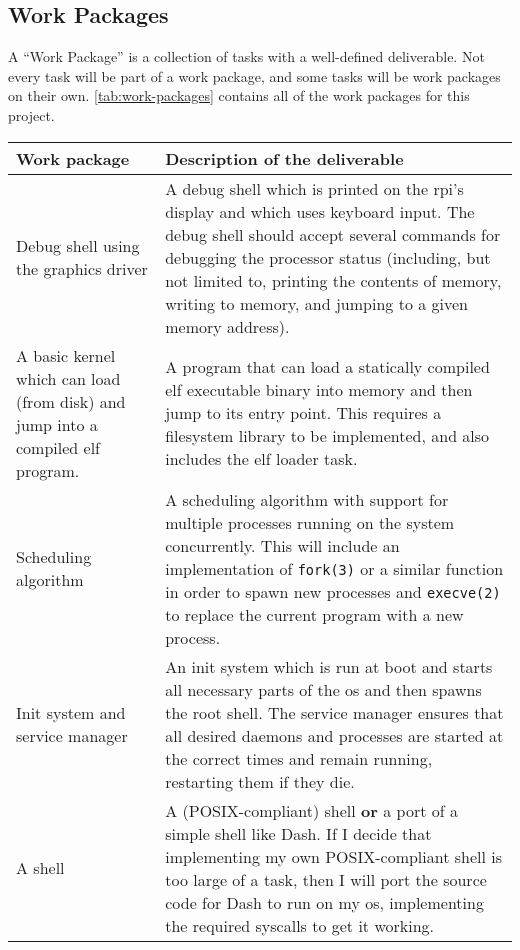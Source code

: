 \documentclass{article}
\begin{document}
\subsection*{Work Packages}
A ``Work Package'' is a collection of tasks with a well-defined deliverable.
Not every task will be part of a work package, and some tasks will be work
packages on their own. \autoref{tab:work-packages} contains all of the work
packages for this project.

\begin{table}[tbp]
\begin{center}
\begin{tabular}{|p{45mm}|p{125mm}|}
    \hline
    \textbf{Work package} & \textbf{Description of the deliverable} \\
    \hline
    Debug shell using the graphics driver &
    A debug shell which is printed on the \gls{rpi}'s display and which uses
    keyboard input. The debug shell should accept several commands for
    debugging the processor status (including, but not limited to, printing the
    contents of memory, writing to memory, and jumping to a given memory
    address).
    \\ \hline
    A basic kernel which can load (from disk) and jump into a compiled \gls{elf}
    program. &
    A program that can load a statically compiled \gls{elf} executable binary
    into memory and then jump to its entry point. This requires a filesystem
    library to be implemented, and also includes the \gls{elf} loader task.
    \\ \hline
    Scheduling algorithm &
    A scheduling algorithm with support for multiple processes running on the
    system concurrently. This will include an implementation of
    \texttt{fork(3)} or a similar function in order to spawn new processes and
    \texttt{execve(2)} to replace the current program with a new process.
    \\ \hline
    Init system and service manager &
    An init system which is run at boot and starts all necessary parts of the
    \gls{os} and then spawns the root shell. The service manager ensures that
    all desired daemons and processes are started at the correct times and
    remain running, restarting them if they die.
    \\ \hline
    A shell &
    A (POSIX-compliant) shell \textbf{or} a port of a simple shell like
    Dash\cite{dash-shell}. If I decide that implementing my own POSIX-compliant
    shell is too large of a task, then I will port the source code for Dash to
    run on my \gls{os}, implementing the required syscalls to get it working.

\end{tabular}
\end{center}
\end{table}
\end{document}
